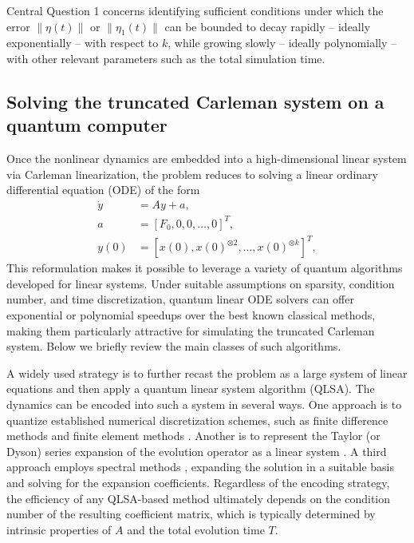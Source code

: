 \documentclass[superscriptaddress,onecolumn,nofootinbib,longbibliography,a4paper,accepted=2026-09-29]{quantumarticle}
\theoremstyle{plain}
\theoremstyle{definition}
\numberwithin{thm}{section}
\numberwithin{assumption}{section}
\numberwithin{lemma}{section}
\numberwithin{prop}{section}
\numberwithin{cor}{section}
\numberwithin{definition}{section}
\numberwithin{rmk}{section}
\numberwithin{equation}{section}
\begin{document}
Central Question 1 concerns identifying sufficient conditions under which the error $\|\eta(t)\|$ or $\|\eta_1(t)\|$ can be bounded to decay rapidly -- ideally exponentially -- with respect to $k$, while growing slowly -- ideally polynomially -- with other relevant parameters such as the total simulation time.





\subsection{Solving the truncated Carleman system on a quantum computer}

Once the nonlinear dynamics are embedded into a high-dimensional linear system via Carleman linearization, the problem reduces to solving a linear ordinary differential equation (ODE) of the form 
\begin{align}
\dot{y} &= A y + a, \\    
a &= [F_0, 0, 0, \dots , 0]^T,  \\
y(0) &= [ x(0),x(0)^{\otimes 2}, \dots, x(0)^{\otimes k} ]^T,
\end{align}
This reformulation makes it possible to leverage a variety of quantum algorithms developed for linear systems. Under suitable assumptions on sparsity, condition number, and time discretization, quantum linear ODE solvers can offer exponential or polynomial speedups over the best known classical methods, making them particularly attractive for simulating the truncated Carleman system. Below we briefly review the main classes of such algorithms.

A widely used strategy is to further recast the problem as a large system of linear equations and then apply a quantum linear system algorithm (QLSA). The dynamics can be encoded into such a system in several ways. One approach is to quantize established numerical discretization schemes, such as finite difference methods \cite{berry2014high} and finite element methods \cite{montanaro2016quantum}. Another is to represent the Taylor (or Dyson) series expansion of the evolution operator as a linear system \cite{berry2017quantum, berry2024quantum, krovi2023improved, jennings2023cost}. A third approach employs spectral methods \cite{childs2020quantum, childs2021highprecision}, expanding the solution in a suitable basis and solving for the expansion coefficients. Regardless of the encoding strategy, the efficiency of any QLSA-based method ultimately depends on the condition number of the resulting coefficient matrix, which is typically determined by intrinsic properties of $A$ and the total evolution time $T$. 
\end{document}

